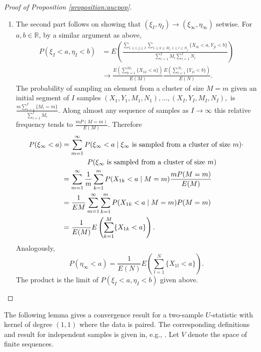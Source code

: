 \documentclass[12pt]{article}
\newcommand{\I}{I}
\newcommand{\E}{E}
\renewcommand{\P}{P}
\newcommand{\seqspace}{V}%
\newcommand{\comment}[1]{
  \iftoggle{commenttoggle}{
    {\normalsize{\color{red}{ #1}}\normalsize}
  }
  {}
}
\begin{document}
\begin{proof}[Proof of Proposition \ref{proposition:aucpop}]
\begin{enumerate}
    \item The second part follows on showing that $(\xi_\I,\eta_\I)\to (\xi_\infty,\eta_\infty)$ setwise. %
      For $a,b\in\mathbb{R}$, by a similar argument as above,
      \begin{align}
        \P(\xi_\I<a,\eta_\I<b) &=\E\left(\frac
                                     {\sum_{1\le i,j\le\I}\sum_{1\le k\le M_i,1\le l\le N_j}\{X_{ik}<a,Y_{jl}<b\}}
                                 {\sum_{i=1}^\I M_i \sum_{i=1}^\I N_i} \right)\\
                               &\to \frac{\E\left(\sum_{k=1}^{M_1}\{X_{1k}<a\}\right)}{\E (M)}
                                 \frac{\E\left(\sum_{l=1}^{N_1}\{Y_{1l}<b\}\right)}{\E (N)}.
      \end{align}
      The probability of sampling an element from a cluster of size
      $M=m$ given an initial segment of $\I$ samples
      $(X_1,Y_1,M_1,N_1),\ldots,(X_\I,Y_\I,M_\I,N_\I),$ is
      $\frac{m\sum_{i=1}^\I\{M_i=m\}}{\sum_{i=1}^\I M_i}$. Along almost
      any sequence of samples as $\I\to\infty$ this relative frequency
      tends to $\frac{m\P(M=m)}{\E (M)}$. Therefore
      \begin{align}
        \P(\xi_\infty < a) &= \sum_{m=1}^\infty\P(\xi_\infty < a \mid \xi_\infty\text{ is sampled from a cluster of size }m)\cdot\\
        &\hspace{.5in}\P(\xi_\infty\text{ is sampled from a cluster of size }m)\\
                           &= \sum_{m=1}^\infty\frac{1}{m}\sum_{k=1}^m\P(X_{1k}<a\mid M=m)\frac{m\P(M=m)}{\E (M)}\\
                           &=\frac{1}{\E M}\sum_{m=1}^\infty\sum_{k=1}^m\P(X_{1k}<a\mid M=m)\P(M=m)\\
        &=\frac{1}{\E (M)}\E\left(\sum_{k=1}^M\{X_{1k}<a\}\right).
      \end{align}
      Analogously,
      $$
      \P(\eta_\infty < a)=\frac{1}{\E (N)}\E\left(\sum_{l=1}^N\{X_{1l}<a\}\right).
      $$
      The product is the limit of
      $\P(\xi_\I<a,\eta_\I<b)$ given above.
    \end{enumerate}
  \end{proof}
    The following lemma gives a convergence result for a two-sample $U$-statistic with kernel of degree $(1,1)$ where the data is paired. The corresponding definitions and result for independent samples is given in, e.g., \cite{lee2019}. Let $\seqspace$ denote the space of finite sequences.%
\end{document}
